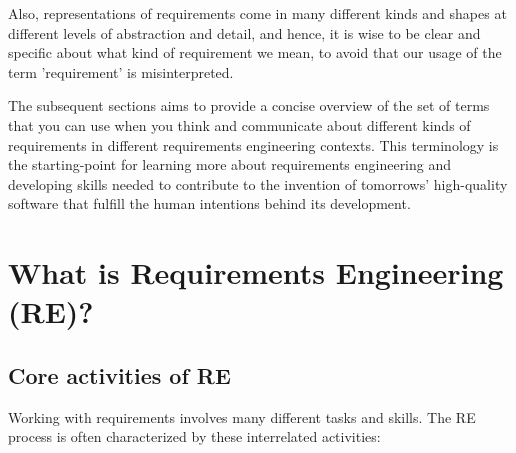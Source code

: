 Also, representations of requirements come in many different kinds and shapes at different levels of abstraction and detail, and hence, it is wise to be clear and specific about what kind of requirement we mean, to avoid that our usage of the term 'requirement' is misinterpreted. 


The subsequent sections aims to provide a concise overview of the set of terms that you can use when you think and communicate about different kinds of requirements in different requirements engineering contexts. This terminology is the starting-point for learning more about requirements engineering and developing skills needed to contribute to the invention of tomorrows' high-quality software that fulfill the human intentions behind its development.

\section{What is Requirements Engineering (RE)?}%
\subsection{Core activities of RE}%
\MarginPage{

}%
Working with requirements involves many different tasks and skills. The RE process is often characterized by these interrelated activities: 

